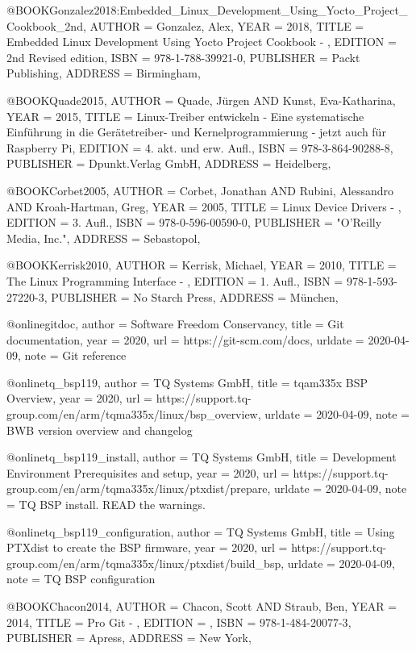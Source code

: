 @BOOK{Gonzalez2018:Embedded_Linux_Development_Using_Yocto_Project_Cookbook_2nd,
	AUTHOR = {Gonzalez, Alex},
	YEAR = {2018},
	TITLE = {Embedded Linux Development Using Yocto Project Cookbook - },
	EDITION = {2nd Revised edition},
	ISBN = {978-1-788-39921-0},
	PUBLISHER = {Packt Publishing},
	ADDRESS = {Birmingham},
}

@BOOK{Quade2015,
	AUTHOR = {Quade, Jürgen AND Kunst, Eva-Katharina},
	YEAR = {2015},
	TITLE = {Linux-Treiber entwickeln - Eine systematische Einführung in die Gerätetreiber- und Kernelprogrammierung - jetzt auch für Raspberry Pi},
	EDITION = {4. akt. und erw. Aufl.},
	ISBN = {978-3-864-90288-8},
	PUBLISHER = {Dpunkt.Verlag GmbH},
	ADDRESS = {Heidelberg},
}

@BOOK{Corbet2005,
	AUTHOR = {Corbet, Jonathan AND Rubini, Alessandro AND Kroah-Hartman, Greg},
	YEAR = {2005},
	TITLE = {Linux Device Drivers - },
	EDITION = {3. Aufl.},
	ISBN = {978-0-596-00590-0},
	PUBLISHER = {"O'Reilly Media, Inc."},
	ADDRESS = {Sebastopol},
}

@BOOK{Kerrisk2010,
	AUTHOR = {Kerrisk, Michael},
	YEAR = {2010},
	TITLE = {The Linux Programming Interface - },
	EDITION = {1. Aufl.},
	ISBN = {978-1-593-27220-3},
	PUBLISHER = {No Starch Press},
	ADDRESS = {München},
}



@online{gitdoc,
author = {Software Freedom Conservancy},
title = {Git documentation},
year = 2020,
url = {https://git-scm.com/docs},
urldate = {2020-04-09},
note = {Git reference}
}

@online{tq_bsp119,
author = {TQ Systems GmbH},
title = {tqam335x BSP Overview},
year = 2020,
url = {https://support.tq-group.com/en/arm/tqma335x/linux/bsp_overview},
urldate = {2020-04-09},
note = {BWB version overview and changelog}
}

@online{tq_bsp119_install,
author = {TQ Systems GmbH},
title = {Development Environment Prerequisites and setup},
year = 2020,
url = {https://support.tq-group.com/en/arm/tqma335x/linux/ptxdist/prepare},
urldate = {2020-04-09},
note = {TQ BSP install. READ the warnings.}
}

@online{tq_bsp119_configuration,
author = {TQ Systems GmbH},
title = {Using PTXdist to create the BSP firmware},
year = 2020,
url = {https://support.tq-group.com/en/arm/tqma335x/linux/ptxdist/build_bsp},
urldate = {2020-04-09},
note = {TQ BSP configuration}
}

@BOOK{Chacon2014,
	AUTHOR = {Chacon, Scott AND Straub, Ben},
	YEAR = {2014},
	TITLE = {Pro Git - },
	EDITION = {},
	ISBN = {978-1-484-20077-3},
	PUBLISHER = {Apress},
	ADDRESS = {New York},
}

